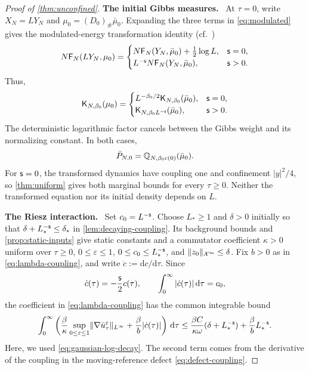 \documentclass[11pt,reqno]{amsart}
\numberwithin{equation}{section}
\theoremstyle{plain}
\theoremstyle{remark}
\DeclarePairedDelimiter{\norm}{\lVert}{\rVert}
\newcommand{\K}{\mathsf K}\newcommand{\g}{\mathsf g}\newcommand{\Fr}{\mathsf F}
\newcommand{\parheading}[1]{\par\medskip\noindent\textbf{#1}\ }
\newcommand{\Xspace}{\mathcal X}
\begin{document}
\begin{proof}[Proof of \cref{thm:unconfined}]
\parheading{The initial Gibbs measures.}
At $\tau=0$, write $X_N=LY_N$ and $\mu_0=(D_0)_\#\bar\mu_0$. Expanding the three terms in \eqref{eq:modulated} gives the modulated-energy transformation identity (cf.\ \cite[Lemma~2.3]{RSselfsimilar})
\begin{equation}\label{eq:selfsimilar-energy-scaling}
 N\Fr_N(LY_N,\mu_0)=
 \begin{cases}
 N\Fr_N(Y_N,\bar\mu_0)+\tfrac12\log L,&\s=0,\\
 L^{-\s}N\Fr_N(Y_N,\bar\mu_0),&\s>0.
 \end{cases}
\end{equation}
Thus,
\begin{equation}\label{eq:selfsimilar-partition-scaling}
 \K_{N,\beta_0}(\mu_0)=
 \begin{cases}
 L^{-\beta_0/2}\K_{N,\beta_0}(\bar\mu_0),&\s=0,\\
 \K_{N,\beta_0L^{-\s}}(\bar\mu_0),&\s>0.
 \end{cases}
\end{equation}
The deterministic logarithmic factor cancels between the Gibbs weight and its normalizing constant. In both cases,
\begin{equation}\label{eq:selfsimilar-preparation}
 \bar P_{N,0}=\mathbb Q_{N,\beta_0c(0)}(\bar\mu_0).
\end{equation}
For $\mathsf{s}=0$, the transformed dynamics have coupling one and confinement $|y|^2/4$, so \cref{thm:uniform} gives both marginal bounds for every $\tau\ge0$. Neither the transformed equation nor its initial density depends on $L$.

\parheading{The Riesz interaction.}
Set $c_0=L^{-\mathsf{s}}$. Choose $L_*\ge1$ and $\delta>0$ initially so that $\delta+L_*^{-\mathsf{s}}\le\delta_*$ in \cref{lem:decaying-coupling}. Its background bounds and \cref{prop:static-inputs} give static constants and a commutator coefficient $\kappa>0$ uniform over $\tau\ge0$, $0\le\varepsilon\le1$, $0\le c_0\le L_*^{-\mathsf{s}}$, and $\norm{z_0}_{\Xspace^m}\le\delta$. Fix $b>0$ as in \eqref{eq:lambda-coupling}, and write $\dot c:=\mathrm dc/\mathrm d\tau$. Since
\begin{equation}\label{eq:selfsimilar-coupling-variation}
 \dot c(\tau)=-\frac{\mathsf{s}}2c(\tau),\qquad
 \int_0^\infty|\dot c(\tau)|\,\mathrm d\tau=c_0,
\end{equation}
the coefficient in \eqref{eq:lambda-coupling} has the common integrable bound
\begin{equation}\label{eq:selfsimilar-expenditure-bound}
 \int_0^\infty\left(\frac\beta\kappa\sup_{0\le\varepsilon\le1}\norm{\nabla\bar u_\tau^\varepsilon}_{L^\infty}
       +\frac\beta b|\dot c(\tau)|\right)\dd\tau
 \le\frac{\beta C}{\kappa\omega}(\delta+L_*^{-\s})+\frac\beta bL_*^{-\s}.
\end{equation}
Here, we used \eqref{eq:gaussian-log-decay}. The second term comes from the derivative of the coupling in the moving-reference defect \eqref{eq:defect-coupling}.


\end{proof}
\end{document}
